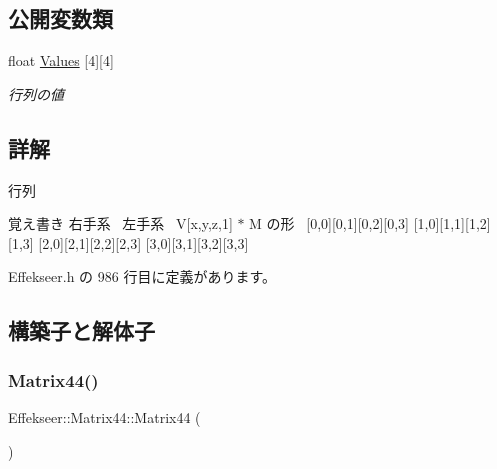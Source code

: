\subsection*{公開変数類}
\begin{DoxyCompactItemize}
\item 
float \mbox{\hyperlink{struct_effekseer_1_1_matrix44_ac747413302e165521317a399db929313}{Values}} \mbox{[}4\mbox{]}\mbox{[}4\mbox{]}
\begin{DoxyCompactList}\small\item\em 行列の値 \end{DoxyCompactList}\end{DoxyCompactItemize}


\subsection{詳解}
行列 

\begin{DoxyNote}{覚え書き}
右手系~\newline
 左手系~\newline
 V\mbox{[}x,y,z,1\mbox{]} $\ast$ M の形~\newline
 \mbox{[}0,0\mbox{]}\mbox{[}0,1\mbox{]}\mbox{[}0,2\mbox{]}\mbox{[}0,3\mbox{]} \mbox{[}1,0\mbox{]}\mbox{[}1,1\mbox{]}\mbox{[}1,2\mbox{]}\mbox{[}1,3\mbox{]} \mbox{[}2,0\mbox{]}\mbox{[}2,1\mbox{]}\mbox{[}2,2\mbox{]}\mbox{[}2,3\mbox{]} \mbox{[}3,0\mbox{]}\mbox{[}3,1\mbox{]}\mbox{[}3,2\mbox{]}\mbox{[}3,3\mbox{]} 
\end{DoxyNote}


 Effekseer.\+h の 986 行目に定義があります。



\subsection{構築子と解体子}
\mbox{\label{struct_effekseer_1_1_matrix44_a8dd9366a02a58a0652eaace2fd9bbb94}} 
\subsubsection{\texorpdfstring{Matrix44()}{Matrix44()}}
{\footnotesize\ttfamily Effekseer\+::\+Matrix44\+::\+Matrix44 (\begin{DoxyParamCaption}{ }\end{DoxyParamCaption})}



